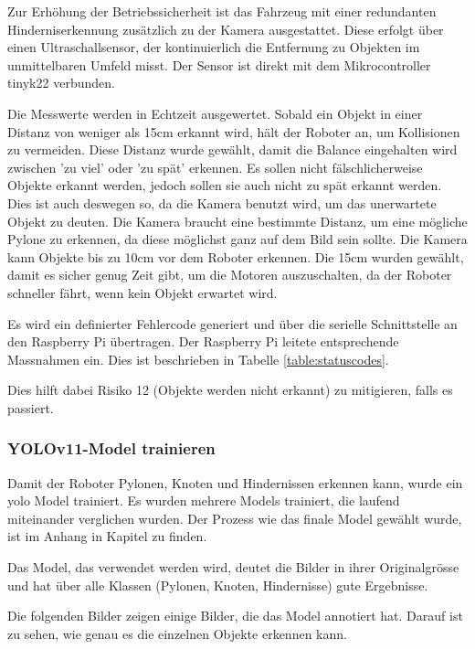 Zur Erhöhung der Betriebssicherheit ist das Fahrzeug mit einer redundanten Hinderniserkennung zusätzlich zu der Kamera ausgestattet. Diese erfolgt über einen Ultraschallsensor, der kontinuierlich die Entfernung zu Objekten im unmittelbaren Umfeld misst. Der Sensor ist direkt mit dem Mikrocontroller \gls{tinyk22} verbunden.

Die Messwerte werden in Echtzeit ausgewertet. Sobald ein Objekt in einer Distanz von weniger als 15cm erkannt wird, hält der Roboter an, um Kollisionen zu vermeiden. Diese Distanz wurde gewählt, damit die Balance eingehalten wird zwischen 'zu viel' oder 'zu spät' erkennen. Es sollen nicht fälschlicherweise Objekte erkannt werden, jedoch sollen sie auch nicht zu spät erkannt werden. Dies ist auch deswegen so, da die Kamera benutzt wird, um das unerwartete Objekt zu deuten. Die Kamera braucht eine bestimmte Distanz, um eine mögliche Pylone zu erkennen, da diese möglichst ganz auf dem Bild sein sollte. Die Kamera kann Objekte bis zu 10cm vor dem Roboter erkennen. 
Die 15cm wurden gewählt, damit es sicher genug Zeit gibt, um die Motoren auszuschalten, da der Roboter schneller fährt, wenn kein Objekt erwartet wird.

Es wird ein definierter Fehlercode generiert und über die serielle Schnittstelle an den Raspberry Pi übertragen. Der Raspberry Pi leitete entsprechende Massnahmen ein. Dies ist beschrieben in Tabelle \ref{table:statuscodes}.

Dies hilft dabei Risiko 12 (Objekte werden nicht erkannt) zu mitigieren, falls es passiert.



\subsubsection{YOLOv11-Model trainieren}

Damit der Roboter Pylonen, Knoten und Hindernissen erkennen kann, wurde ein \gls{yolo} Model trainiert.
Es wurden mehrere Models trainiert, die laufend miteinander verglichen wurden. Der Prozess wie das finale Model gewählt wurde, ist im Anhang in Kapitel  zu finden.

Das Model, das verwendet werden wird, deutet die Bilder in ihrer Originalgrösse und hat über alle Klassen (Pylonen, Knoten, Hindernisse) gute Ergebnisse.

Die folgenden Bilder zeigen einige Bilder, die das Model annotiert hat. Darauf ist zu sehen, wie genau es die einzelnen Objekte erkennen kann.

